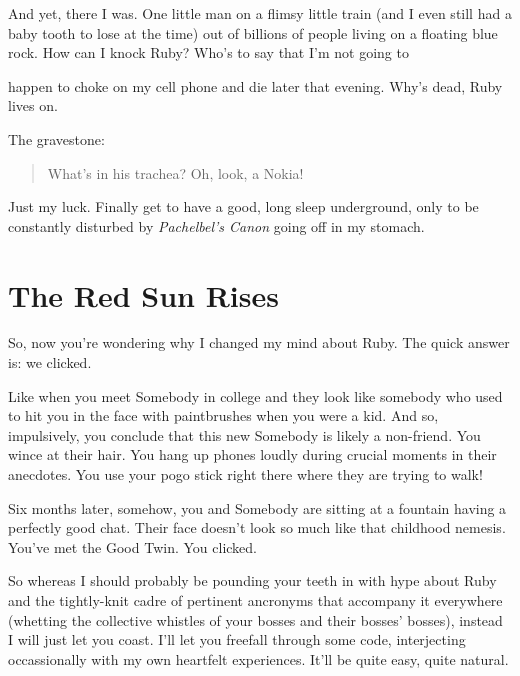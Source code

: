 \documentclass[12pt,twoside]{report}
\begin{document}
{ And yet, there I was.  One little man on a flimsy little train (and I
even still had a baby tooth to lose at the time) out of billions of
people living on a floating blue rock.  How can I knock Ruby?  Who's
to say that I'm not going to \unskip\parfillskip 0pt \par}

\pagebreak

happen to choke on my cell phone and die
later that evening.  Why's dead, Ruby lives on.

The gravestone:

\begin{quote}
What's in his trachea? Oh, look, a Nokia!\end{quote}

Just my luck.  Finally get to have a good, long sleep underground,
only to be constantly disturbed by {\em Pachelbel's Canon} going off
in my stomach.


\section{The Red Sun Rises}


So, now you're wondering why I changed my mind about Ruby.  The quick
answer is: we clicked.

Like when you meet Somebody in college and they look like somebody who
used to hit you in the face with paintbrushes when you were a kid.
And so, impulsively, you conclude that this new Somebody is likely a
non-friend.  You wince at their hair.  You hang up phones loudly
during crucial moments in their anecdotes.  You use your pogo stick
right there where they are trying to walk!

Six months later, somehow, you and Somebody are sitting at a fountain
having a perfectly good chat.  Their face doesn't look so much like
that childhood nemesis.  You've met the Good Twin.  You clicked.

So whereas I should probably be pounding your teeth in with hype about
Ruby and the tightly-knit cadre of pertinent ancronyms that accompany
it everywhere (whetting the collective whistles of your bosses and
their bosses' bosses), instead I will just let you coast.  I'll let
you freefall through some code, interjecting occassionally with my own
heartfelt experiences.  It'll be quite easy, quite natural.
\end{document}
